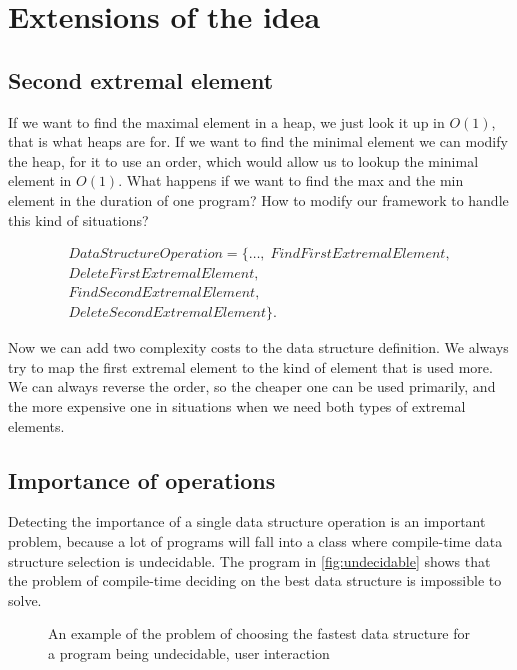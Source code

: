 \documentclass[a4paper,11pt]{article}
\begin{document}
        \clearpage


\pagebreak

\section{Extensions of the idea}

	\subsection{Second extremal element}

		If we want to find the maximal element in a heap, we just look it up in $O(1)$, that is what heaps are
		for.  If we want to find the minimal element we can modify the heap, for it to use an order, which would
		allow us to lookup the minimal element in $O(1)$.  What happens if we want to find the max and the min
		element in the duration of one program?  How to modify our framework to handle this kind of situations?

		\begin{eqnarray*}
			DataStructureOperation = \{\dots, \; FindFirstExtremalElement,\\
			DeleteFirstExtremalElement,\\
			FindSecondExtremalElement,\\
			DeleteSecondExtremalElement\}.
		\end{eqnarray*}

        Now we can add two complexity costs to the data structure definition. We always try to map the first extremal
        element to the kind of element that is used more. We can always reverse the order, so the cheaper one can be
        used primarily, and the more expensive one in situations when we need both types of extremal elements.

	\subsection{Importance of operations} \label{sub:importance}

		Detecting the importance of a single data structure operation is an important problem, because a lot of
		programs will fall into a class where compile-time data structure selection is undecidable. The
        program in \autoref{fig:undecidable} shows that the problem of compile-time deciding on the best data structure
        is impossible to solve.

        \begin{figure}[!h]
			

			\caption{An example of the problem of choosing the fastest data structure for a program being
			undecidable, user interaction}

			\label{fig:undecidable}
		\end{figure}
\end{document}
